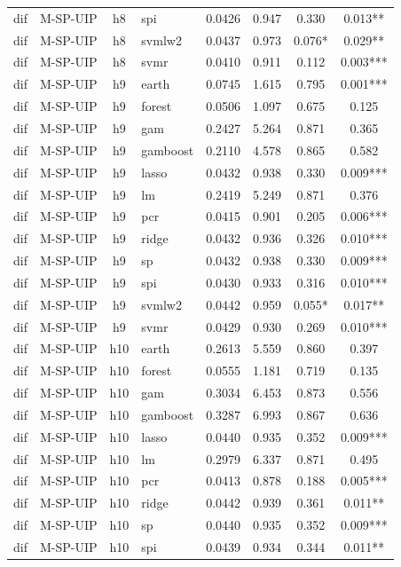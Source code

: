 \begin{ThreePartTable}
\begin{longtable}[t]{llclcccc}
dif & M-SP-UIP & h8 & spi & 0.0426 & 0.947 & 0.330 & 0.013**\\
dif & M-SP-UIP & h8 & svmlw2 & 0.0437 & 0.973 & 0.076* & 0.029**\\
dif & M-SP-UIP & h8 & svmr & 0.0410 & 0.911 & 0.112 & 0.003***\\
\addlinespace
dif & M-SP-UIP & h9 & earth & 0.0745 & 1.615 & 0.795 & 0.001***\\
dif & M-SP-UIP & h9 & forest & 0.0506 & 1.097 & 0.675 & 0.125\\
dif & M-SP-UIP & h9 & gam & 0.2427 & 5.264 & 0.871 & 0.365\\
dif & M-SP-UIP & h9 & gamboost & 0.2110 & 4.578 & 0.865 & 0.582\\
dif & M-SP-UIP & h9 & lasso & 0.0432 & 0.938 & 0.330 & 0.009***\\
dif & M-SP-UIP & h9 & lm & 0.2419 & 5.249 & 0.871 & 0.376\\
dif & M-SP-UIP & h9 & pcr & 0.0415 & 0.901 & 0.205 & 0.006***\\
dif & M-SP-UIP & h9 & ridge & 0.0432 & 0.936 & 0.326 & 0.010***\\
dif & M-SP-UIP & h9 & sp & 0.0432 & 0.938 & 0.330 & 0.009***\\
dif & M-SP-UIP & h9 & spi & 0.0430 & 0.933 & 0.316 & 0.010***\\
dif & M-SP-UIP & h9 & svmlw2 & 0.0442 & 0.959 & 0.055* & 0.017**\\
dif & M-SP-UIP & h9 & svmr & 0.0429 & 0.930 & 0.269 & 0.010***\\
\addlinespace
dif & M-SP-UIP & h10 & earth & 0.2613 & 5.559 & 0.860 & 0.397\\
dif & M-SP-UIP & h10 & forest & 0.0555 & 1.181 & 0.719 & 0.135\\
dif & M-SP-UIP & h10 & gam & 0.3034 & 6.453 & 0.873 & 0.556\\
dif & M-SP-UIP & h10 & gamboost & 0.3287 & 6.993 & 0.867 & 0.636\\
dif & M-SP-UIP & h10 & lasso & 0.0440 & 0.935 & 0.352 & 0.009***\\
dif & M-SP-UIP & h10 & lm & 0.2979 & 6.337 & 0.871 & 0.495\\
dif & M-SP-UIP & h10 & pcr & 0.0413 & 0.878 & 0.188 & 0.005***\\
dif & M-SP-UIP & h10 & ridge & 0.0442 & 0.939 & 0.361 & 0.011**\\
dif & M-SP-UIP & h10 & sp & 0.0440 & 0.935 & 0.352 & 0.009***\\
dif & M-SP-UIP & h10 & spi & 0.0439 & 0.934 & 0.344 & 0.011**\\

\end{longtable}
\end{ThreePartTable}
